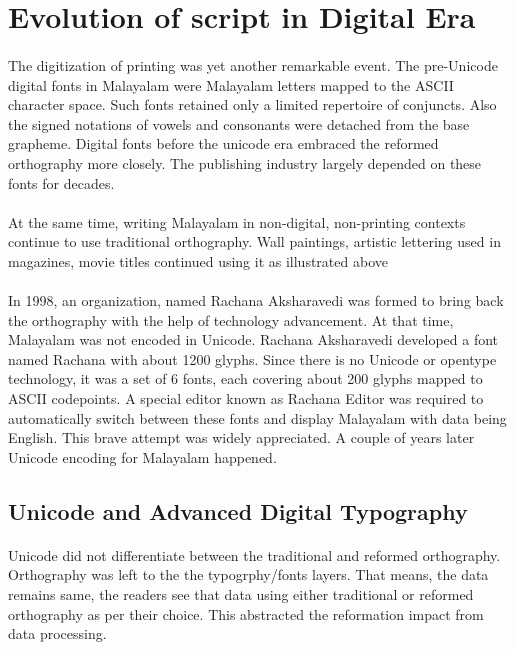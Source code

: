 \documentclass[10pt]{article}
\begin{document}
\section{Evolution of script in Digital Era}

\paragraph{}
The digitization of printing was yet another remarkable event. The pre-Unicode digital fonts in Malayalam were Malayalam letters mapped to the ASCII character space. Such fonts retained only a limited repertoire of conjuncts. Also the signed notations of vowels and consonants were detached from the base grapheme. Digital fonts before the unicode era embraced the reformed orthography more closely. The publishing industry largely depended on these fonts for decades.

\paragraph{}
At the same time, writing Malayalam in non-digital, non-printing contexts continue to use traditional orthography. Wall paintings, artistic lettering used in magazines, movie titles continued using it as illustrated above

\paragraph{}
In 1998, an organization, named Rachana Aksharavedi was formed to bring back the orthography with the help of technology advancement. At that time, Malayalam was not encoded in Unicode. Rachana Aksharavedi developed a font named Rachana with about 1200 glyphs. Since there is no Unicode or opentype technology, it was a set of 6 fonts, each covering about 200 glyphs mapped to ASCII codepoints. A special editor known as Rachana Editor was required to automatically switch between these fonts and display Malayalam with data being English. This brave attempt was widely appreciated. A couple of years later Unicode encoding for Malayalam happened.

\subsection{Unicode and Advanced Digital Typography}

\paragraph{}
Unicode did not differentiate between the traditional and reformed orthography. Orthography was left to the the typogrphy/fonts layers. That means, the data remains same, the readers see that data using either traditional or reformed orthography as per their choice. This abstracted the reformation impact from data processing.
\end{document}

